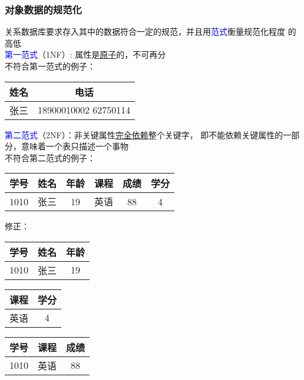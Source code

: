 \documentclass[compress]{beamer}
\begin{document}
\begin{frame}
  \frametitle{对象数据的规范化}
   {
    关系数据库要求存入其中的数据符合一定的规范，并且用\textcolor{blue}{范式}衡量规范化程度
    的高低 \\[2ex]
    \textcolor{blue}{第一范式}（1NF）: 属性是\uline{原子}的，不可再分 \\[2ex]

    不符合第一范式的例子：\\[3ex]

    \begin{tabular}{|c|c|}
      \hline
    姓名 & 电话 \\ \hline \hline
    张三 & \hspace*{2ex} 18900010002 \hspace*{2ex} \vline \hspace*{2ex} 62750114
    \hspace*{2ex} \\ \hline
  \end{tabular}

}
 
 {
  \textcolor{blue}{第二范式}（2NF）：非关键属性\uline{完全依赖}整个关键字，
  即不能依赖关键属性的一部分，意味着一个表只描述一个事物 \\[2ex]

    不符合第二范式的例子：\\[2ex]

    \begin{tabular}{|c|c|c|c|c|c|}
      \hline
      学号 & 姓名 & 年龄 & 课程 & 成绩 & 学分 \\ \hline \hline
     1010 & 张三 & 19 & 英语 & 88 & 4 \\
    \hline
  \end{tabular}
}

 {
  \vspace*{2ex}
  修正： \\[2ex]
    \begin{tabular}{|c|c|c|}
      \hline
      学号 & 姓名 & 年龄 \\ \hline \hline
     1010 & 张三 & 19  \\
    \hline
  \end{tabular}
    \begin{tabular}{|c|c|}
      \hline
      课程 & 学分 \\ \hline \hline
     英语 & 4  \\
    \hline
  \end{tabular}
    \begin{tabular}{|c|c|c|}
      \hline
      学号 & 课程 & 成绩 \\ \hline \hline
     1010 & 英语 & 88  \\
    \hline
  \end{tabular}
}


\end{frame}
\end{document}
